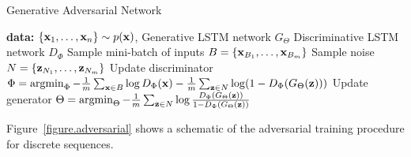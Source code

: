 \begin{algorithm}[H]                      %
\caption{Generative Adversarial Network \cite{sonderby2016amortised}}          %
\label{alg}                           %
\begin{algorithmic}[1]                    %
	\STATE \textbf{data:} $\{ \mathbf{x}_1, \ldots, \mathbf{x}_n\} \sim p(\mathbf{x})$,
	\STATE Generative LSTM network $G_\Theta$
	\STATE Discriminative LSTM network $D_\Phi$
		\STATE Sample mini-batch of inputs $B = \{\mathbf{x}_{B_1}, \ldots, \mathbf{x}_{B_m} \}$
		\STATE Sample noise $N = \{\mathbf{z}_{N_1}, \ldots, \mathbf{z}_{N_m}\}$
		\STATE Update discriminator $\Phi = \argmin_\Phi -\frac{1}{m} \sum_{\x \in B} \log D_\Phi(\x) - \frac{1}{m} \sum_{\z \in N} \log(1 - D_\Phi(G_\Theta(\z)))$
		\STATE Update generator $\Theta = \argmin_\Theta - \frac{1}{m} \sum_{\z \in N} \log \frac{D_\Phi(G_\Theta(\z))}{1-D_\Phi(G_\Theta(\z))}$
	\ENDWHILE
\end{algorithmic}
\end{algorithm}

Figure~\ref{figure.adversarial} shows a schematic of the adversarial training procedure for discrete sequences.


